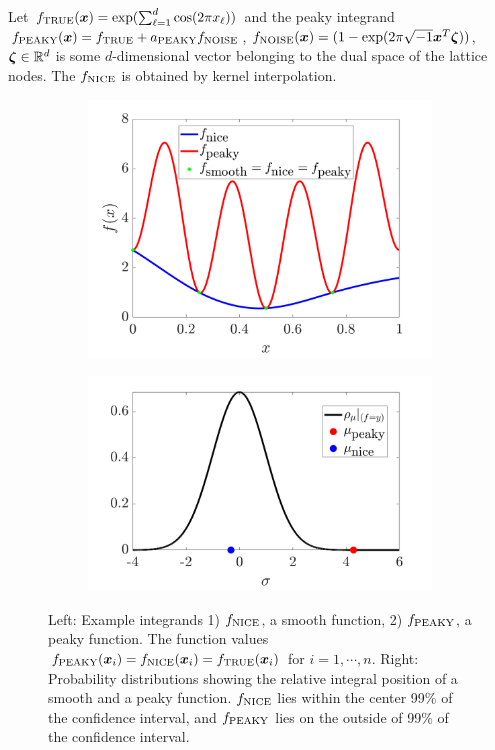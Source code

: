 \documentclass[handout, 10pt,compress,xcolor={usenames,dvipsnames}]{beamer} %
\newcommand{\bm}[1]{\boldsymbol{#1}}
\newcommand{\NICE}{\textup{NICE}}
\newcommand{\PEAKY}{{\textup{PEAKY}}}
\newcommand{\NOISE}{{\textup{NOISE}}}
\newcommand{\TRUE}{\textup{TRUE}}
\newcommand{\vzeta}{{\bm{\zeta}}}
\begin{document}
\begin{frame}{}
	\vspace{-7ex}
	Let $f_{\TRUE}(\vx) = \exp(\sum_{\ell=1}^{d} \cos(2\pi x_\ell))$ and the peaky integrand $f_{\PEAKY}(\vx) = f_{\TRUE} + a_{\PEAKY} f_{\NOISE}$, $f_{\NOISE}(\vx) = (1 - \exp(2\pi \sqrt{-1} \vx^T \vzeta))$, $\vzeta \in \reals^d$ is some $d$-dimensional vector belonging to the dual space of the lattice nodes. The $f_{\NICE}$ is obtained by kernel interpolation.
	\vspace{-4ex}
	\begin{figure}[htp]
		\centering
		\begin{subfigure}[b]{0.44\textwidth}
			\includegraphics[width=0.9\linewidth]{../figures/cone_bayes_f_real}
		\end{subfigure}
		\centering
		\begin{subfigure}[b]{0.55\textwidth}
			\includegraphics[width=0.9\linewidth]{../figures/cone_bayes_mu_pdf}
		\end{subfigure}
		\caption{Left: Example integrands 1) $f_{\NICE}$, a smooth function, 2) $f_{\PEAKY}$, a peaky function. The function values $f_{\PEAKY}(\vx_i) = f_{\NICE}(\vx_i) = f_{\TRUE}(\vx_i) $ for $i=1, \cdots, n$. 
			Right: Probability distributions showing the relative integral position of a smooth and a peaky function. $f_{\NICE}$ lies within the center 99\% of the confidence interval, and $f_{\PEAKY}$ lies on the outside of 99\% of the confidence interval.
		}
	\end{figure}
\end{frame}
\end{document}
